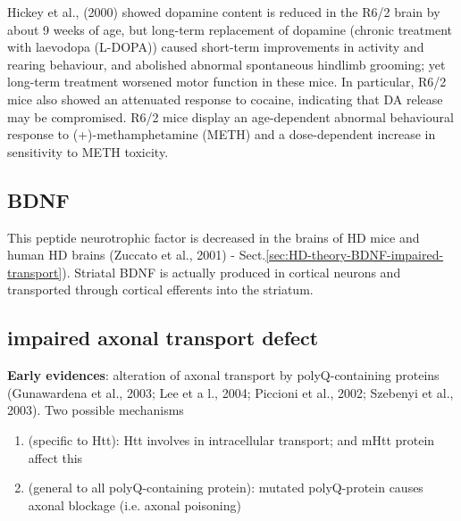 Hickey et al., (2000)  showed dopamine content is reduced in the R6/2 brain by
about 9 weeks of age, but long-term replacement of dopamine (chronic treatment
with laevodopa (L-DOPA)) caused short-term improvements in activity and rearing
behaviour, and abolished abnormal spontaneous hindlimb grooming; yet long-term
treatment worsened motor function in these mice. In particular, R6/2 mice also
showed an attenuated response to cocaine, indicating that DA release may be
compromised.  R6/2 mice display an age-dependent abnormal behavioural response
to (+)-methamphetamine (METH) and a dose-dependent increase in sensitivity to
METH toxicity.


\subsection{BDNF}

This peptide neurotrophic factor is decreased in the brains of HD mice and human
HD brains (Zuccato et al., 2001) -
Sect.\ref{sec:HD-theory-BDNF-impaired-transport}). Striatal BDNF is actually
produced in cortical neurons and transported through cortical efferents into the
striatum.


 
 

\subsection{impaired axonal transport defect}

{\bf Early evidences}: alteration of axonal transport by polyQ-containing
proteins (Gunawardena et al., 2003; Lee et a l., 2004; Piccioni et al., 2002;
Szebenyi et al., 2003). Two possible mechanisms
\begin{enumerate}
  \item (specific to Htt): Htt involves in intracellular transport; and mHtt
  protein affect this
  
  \item (general to all polyQ-containing protein): mutated polyQ-protein causes
  axonal blockage (i.e. axonal poisoning)
\end{enumerate}

